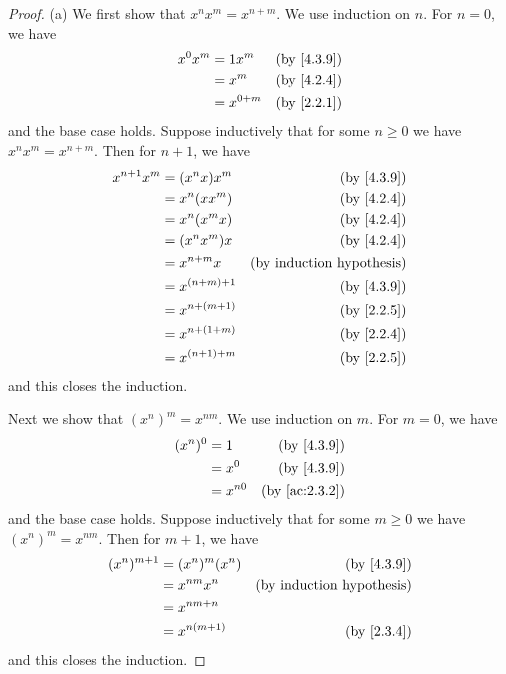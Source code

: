 \begin{proof}{(a)}
  We first show that \(x^n x^m = x^{n + m}\).
  We use induction on \(n\).
  For \(n = 0\), we have
  \begin{align*}
    x^0 x^m & = 1 x^m     & \text{(by \cref{4.3.9})} \\
            & = x^m       & \text{(by \cref{4.2.4})} \\
            & = x^{0 + m} & \text{(by \cref{2.2.1})}
  \end{align*}
  and the base case holds.
  Suppose inductively that for some \(n \geq 0\) we have \(x^n x^m = x^{n + m}\).
  Then for \(n + 1\), we have
  \begin{align*}
    x^{n + 1} x^m & = (x^n x) x^m     & \text{(by \cref{4.3.9})}         \\
                  & = x^n (x x^m)     & \text{(by \cref{4.2.4})}         \\
                  & = x^n (x^m x)     & \text{(by \cref{4.2.4})}         \\
                  & = (x^n x^m) x     & \text{(by \cref{4.2.4})}         \\
                  & = x^{n + m} x     & \text{(by induction hypothesis)} \\
                  & = x^{(n + m) + 1} & \text{(by \cref{4.3.9})}         \\
                  & = x^{n + (m + 1)} & \text{(by \cref{2.2.5})}         \\
                  & = x^{n + (1 + m)} & \text{(by \cref{2.2.4})}         \\
                  & = x^{(n + 1) + m} & \text{(by \cref{2.2.5})}
  \end{align*}
  and this closes the induction.

  Next we show that \((x^n)^m = x^{nm}\).
  We use induction on \(m\).
  For \(m = 0\), we have
  \begin{align*}
    (x^n)^0 & = 1      & \text{(by \cref{4.3.9})}    \\
            & = x^0    & \text{(by \cref{4.3.9})}    \\
            & = x^{n0} & \text{(by \cref{ac:2.3.2})}
  \end{align*}
  and the base case holds.
  Suppose inductively that for some \(m \geq 0\) we have \((x^n)^m = x^{nm}\).
  Then for \(m + 1\), we have
  \begin{align*}
    (x^n)^{m + 1} & = (x^n)^m (x^n) & \text{(by \cref{4.3.9})}         \\
                  & = x^{nm} x^n    & \text{(by induction hypothesis)} \\
                  & = x^{nm + n}                                       \\
                  & = x^{n(m + 1)}  & \text{(by \cref{2.3.4})}
  \end{align*}
  and this closes the induction.


\end{proof}
